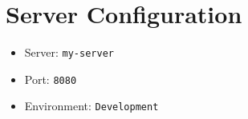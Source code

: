 \documentclass{article}
\begin{document}
\section{Server Configuration}

\begin{itemize}
  \item Server: \texttt{my-server}
  \item Port: \texttt{8080}
  \item Environment: \texttt{Development}
\end{itemize}
\end{document}
